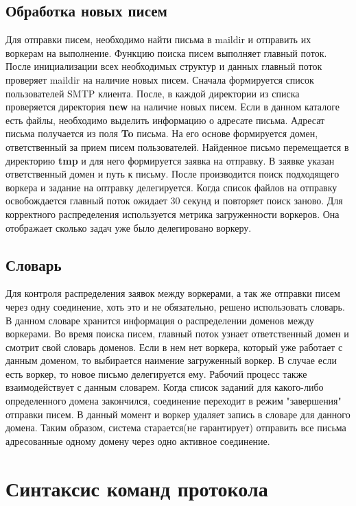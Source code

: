 \documentclass[a4paper,12pt]{report}
\begin{document}
\subsection{Обработка новых писем}
Для отправки писем, необходимо найти письма в maildir и отправить их воркерам на выполнение. Функцию поиска писем выполняет главный поток. После инициализации всех необходимых структур и данных главный поток проверяет maildir на наличие новых писем. Сначала формируется список пользователей SMTP клиента. После, в каждой директории из списка проверяется директория \textbf{new} на наличие новых писем. Если в данном каталоге есть файлы, необходимо выделить информацию о адресате письма. Адресат письма получается из поля \textbf{To} письма. На его основе формируется домен, ответственный за прием писем пользователей. 
Найденное письмо перемещается в директорию \textbf{tmp} и для него формируется заявка на отправку. В заявке указан ответственный домен и путь к письму. После производится поиск подходящего воркера и задание на оптравку делегируется. Когда список файлов на отправку освобождается главный поток ожидает 30 секунд и повторяет поиск заново. Для корректного распределения используется метрика загруженности воркеров. Она отображает сколько задач уже было делегировано воркеру.

\subsection{Словарь}
Для контроля распределения заявок между воркерами, а так же отправки писем через одну соединение, хоть это и не обязательно, решено использовать словарь. В данном словаре хранится информация о распределении доменов между воркерами. Во время поиска писем, главный поток узнает ответственный домен и смотрит свой словарь доменов. Если в нем нет воркера, который уже работает с данным доменом, то выбирается наимение загруженный воркер. В случае если есть воркер, то новое письмо делегируется ему.
Рабочий процесс также взаимодействует с данным словарем. Когда список заданий для какого-либо определенного домена закончился, соединение переходит в режим "завершения" отправки писем. В данный момент и воркер удаляет запись в словаре для данного домена. Таким образом, система старается(не гарантирует) отправить все письма адресованные одному домену через одно активное соединение.

\section{Синтаксис команд протокола}
\end{document}
